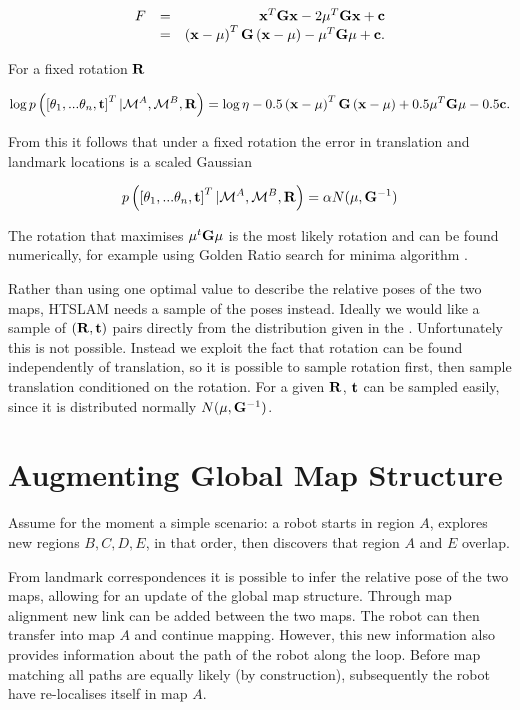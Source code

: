 \begin{equation}
\begin{array}{rcr}
F &=& {\bf x}^T{\bf Gx} - 2{\bf \mu}^T{\bf Gx} + {\bf c}\\
 &=& \left({\bf x - \mu}\right)^T{\bf G}\left( {\bf x - \mu} \right) -
{\bf \mu}^T{\bf G\mu} + {\bf c}.
\end{array}
\end{equation}

For a fixed rotation ${\bf R}$ 

$$
\log p\left(\left[\theta_1, ...\theta_n,{\bf t} \right]^T | 
\mapA, \mapB,{\bf R} \right) =
\log \eta -0.5\left({\bf x - \mu}\right)^T{\bf G}\left( {\bf x - \mu} \right) +
0.5{\bf \mu}^T{\bf G\mu} -0.5 {\bf c}.
$$

From this it follows that under a fixed rotation the error in
translation and landmark locations is a scaled Gaussian

$$
p\left(\left[\theta_1, ...\theta_n,{\bf t}\right]^T | 
\mapA,\mapB,{\bf R}\right) 
= \alpha N({\bf \mu}, {\bf G}^{-1})
$$

The rotation that maximises $\mu^t{\bf G}\mu$ is the most likely
rotation and can be found numerically, for example using Golden Ratio
search for minima algorithm \cite{Pres92}.

Rather than using one optimal value to describe the relative poses of
the two maps, HTSLAM needs a sample of the poses instead. Ideally we
would like a sample of $({\bf R,t})$ pairs directly from the
distribution given in the . Unfortunately
this is not possible. Instead we exploit the fact that rotation
can be found independently of translation, so it is possible to sample
rotation first, then sample translation conditioned on the
rotation. For a given ${\bf R}$, ${\bf t}$ can be sampled easily,
since it is distributed normally $N(\mu, {\bf G}^{-1})$.



\section{Augmenting Global Map Structure}
\label{sec:global_map_update}

Assume for the moment a simple scenario: a robot starts in
region $A$, explores new regions $B,C,D,E$, in that order, then
discovers that region $A$ and $E$ overlap.

From landmark correspondences it is possible to infer the relative
pose of the two maps, allowing for an update of the global map
structure. Through map alignment new link can be added between the two
maps. The robot can then transfer into map $A$ and continue mapping.
However, this new information also provides information about the path
of the robot along the loop. Before map matching all paths are equally
likely (by construction), subsequently the robot have re-localises
itself in map $A$.

